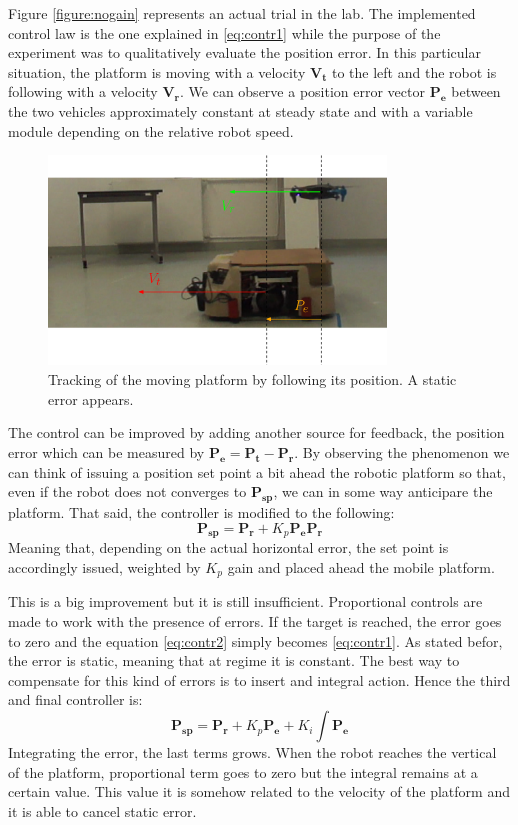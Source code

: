 Figure \ref{figure:nogain} represents an actual trial in the lab. The implemented control law is the one explained in \ref{eq:contr1} while the purpose of the experiment was to qualitatively evaluate the position error. In this particular situation, the platform is moving with a velocity $\boldsymbol{V_t}$ to the left and the robot is following with a velocity $\boldsymbol{V_r}$. We can observe a position error vector $\boldsymbol{P_e}$ between the two vehicles approximately constant at steady state and with a variable module depending on the relative robot speed.
\begin{figure}[h]
 \centering
   \includegraphics[width = 0.8\textwidth ]{tracknogain2.eps}
    \caption[Tracking with no gain]{Tracking of the moving platform by following its position. A static error appears.}
   \label{figure:static}
\end{figure}
The control can be improved by adding  another source for feedback, the position error which can be measured by $\boldsymbol{P_e} = \boldsymbol{P_{t}} - \boldsymbol{P_{r}}$. By observing the phenomenon we can think of issuing a position set point a bit ahead the robotic platform so that, even if the robot does not converges to $\boldsymbol{P_{sp}}$, we can in some way anticipare the platform. That said, the controller is modified to the following:
\begin{equation}
\boldsymbol{P_{sp}} = \boldsymbol{P_{r}} + K_p \boldsymbol{P_e} \boldsymbol{P_{r}}
\label{eq:contr2}
\end{equation}
Meaning that, depending on the actual horizontal error, the set point is accordingly issued, weighted by $K_p$ gain and placed ahead the mobile platform. 

This is a big improvement but it is still insufficient. Proportional controls are made to work with the presence of errors. If the target is reached, the error goes to zero and the equation \ref{eq:contr2} simply becomes \ref{eq:contr1}. As stated befor, the error is static, meaning that at regime it is constant. The best way to compensate for this kind of errors is to insert and integral action. Hence the third and final controller is:
\begin{equation}
\boldsymbol{P_{sp}} = \boldsymbol{P_{r}} + K_p \boldsymbol{P_e} +  K_i \int \boldsymbol{P_e}
\label{eq:contr3}
\end{equation}
Integrating the error, the last terms grows. When the robot reaches the vertical of the platform, proportional term goes to zero but the integral remains at a certain value. This value it is somehow related to the velocity of the platform and it is able to cancel static error.

